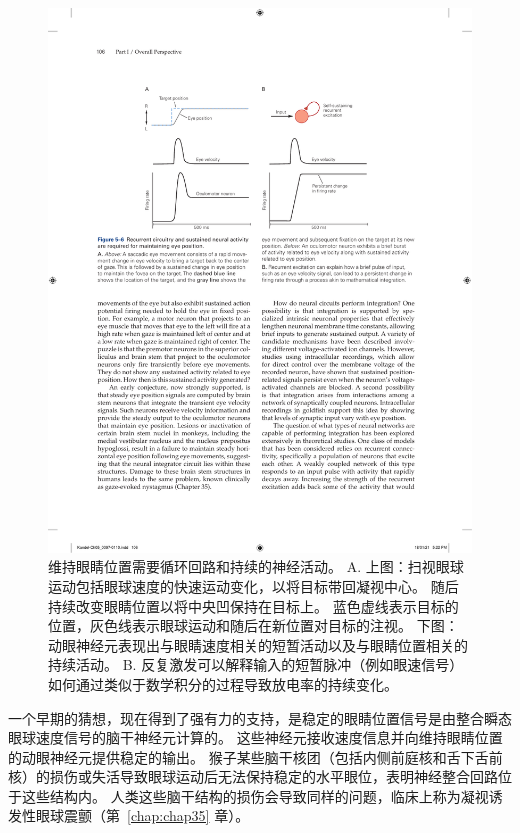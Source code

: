 \begin{figure}[htbp]
	\centering
	\includegraphics[width=1.0\linewidth]{chap05/fig_5_6}
	\caption{维持眼睛位置需要循环回路和持续的神经活动。 
		A. 上图：扫视眼球运动包括眼球速度的快速运动变化，以将目标带回凝视中心。 
		随后持续改变眼睛位置以将中央凹保持在目标上。 
		蓝色虚线表示目标的位置，灰色线表示眼球运动和随后在新位置对目标的注视。 
		下图：动眼神经元表现出与眼睛速度相关的短暂活动以及与眼睛位置相关的持续活动。 
		B. 反复激发可以解释输入的短暂脉冲（例如眼速信号）如何通过类似于数学积分的过程导致放电率的持续变化。}
	\label{fig:5_6}
\end{figure}


一个早期的猜想，现在得到了强有力的支持，是稳定的眼睛位置信号是由整合瞬态眼球速度信号的脑干神经元计算的。 
这些神经元接收速度信息并向维持眼睛位置的动眼神经元提供稳定的输出。 
猴子某些脑干核团（包括内侧前庭核和舌下舌前核）的损伤或失活导致眼球运动后无法保持稳定的水平眼位，表明神经整合回路位于这些结构内。 
人类这些脑干结构的损伤会导致同样的问题，临床上称为凝视诱发性眼球震颤（第~\ref{chap:chap35} 章）。

